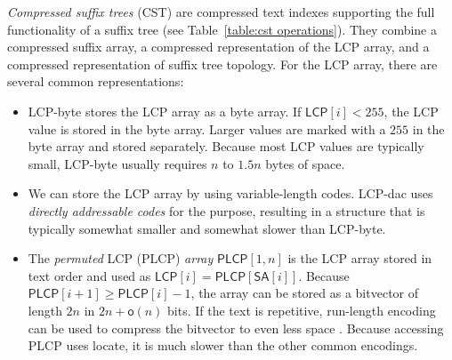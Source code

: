 \documentclass[a4paper,11pt]{llncs}
\newcommand{\CST}{\textsf{CST}}
\newcommand{\mSA}{\ensuremath{\mathsf{SA}}}
\newcommand{\LCP}{\textsf{LCP}}
\newcommand{\PLCP}{\textsf{PLCP}}
\newcommand{\LCPbyte}{\textsf{LCP\nobreakdash-byte}}
\newcommand{\LCPdac}{\textsf{LCP\nobreakdash-dac}}
\newcommand{\mLCP}{\ensuremath{\mathsf{LCP}}}
\newcommand{\mPLCP}{\ensuremath{\mathsf{PLCP}}}
\newcommand{\locate}{\textsf{locate}}
\newcommand{\oh}{\ensuremath{\mathsf{o}}}
\begin{document}
\emph{Compressed suffix trees} (\CST) \cite{Sadakane2007} are compressed text indexes supporting the full functionality of a suffix tree (see Table~\ref{table:cst operations}). They combine a compressed suffix array, a compressed representation of the \LCP{} array, and a compressed representation of suffix tree topology. For the \LCP{} array, there are several common representations:
\begin{itemize}
\item \LCPbyte{} \cite{Abouelhoda2004} stores the \LCP{} array as a byte array. If $\mLCP[i] < 255$, the \LCP{} value is stored in the byte array. Larger values are marked with a $255$ in the byte array and stored separately. Because most \LCP{} values are typically small, \LCPbyte{} usually requires $n$ to $1.5n$ bytes of space.
\item We can store the \LCP{} array by using variable-length codes. \LCPdac{} uses \emph{directly addressable codes} \cite{Brisaboa2009} for the purpose, resulting in a structure that is typically somewhat smaller and somewhat slower than \LCPbyte.
\item The \emph{permuted} \LCP{} (\PLCP) \emph{array} \cite{Sadakane2007} $\mPLCP[1,n]$ is the \LCP{} array stored in text order and used as $\mLCP[i] = \mPLCP[\mSA[i]]$. Because $\mPLCP[i+1] \ge \mPLCP[i]-1$, the array can be stored as a bitvector of length $2n$ in $2n+\oh(n)$ bits. If the text is repetitive, run-length encoding can be used to compress the bitvector to even less space \cite{Fischer2009a}. Because accessing \PLCP{} uses \locate, it is much slower than the other common encodings.
\end{itemize}
\end{document}
